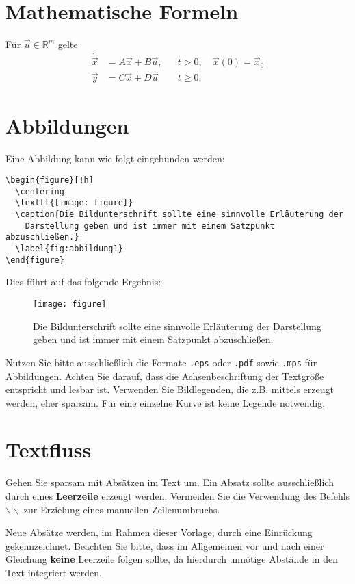 \section{Mathematische Formeln}
%
Für $\vec{u}\in\mathds{R}^m$ gelte 
%
\begin{align}
  \label{eq:gleichung1}
  \dot{\vec{x}} &= A \vec{x} + B \vec{u}, && t>0,\quad\vec{x}(0)=\vec{x}_0\\
  \vec{y} &= C\vec{x} + D\vec{u}&& t\geq 0.
\end{align}
%
%
\section{Abbildungen}
%
Eine Abbildung kann wie folgt eingebunden werden: 
%
\begin{verbatim}
\begin{figure}[!h]
  \centering
  \texttt{[image: figure]}
  \caption{Die Bildunterschrift sollte eine sinnvolle Erläuterung der
    Darstellung geben und ist immer mit einem Satzpunkt abzuschließen.}
  \label{fig:abbildung1}
\end{figure}
\end{verbatim}
%
Dies führt auf das folgende Ergebnis:  
%
\begin{figure}[!h] %
  \centering
  \texttt{[image: figure]}
  \caption{Die Bildunterschrift sollte eine sinnvolle Erläuterung der
    Darstellung geben und ist immer mit einem Satzpunkt abzuschließen.}
  \label{fig:abbildung1}
\end{figure}
%

Nutzen Sie bitte ausschließlich die Formate \texttt{.eps} oder
\texttt{.pdf} sowie \texttt{.mps} für Abbildungen. Achten Sie darauf,
dass die Achsenbeschriftung der Textgröße entspricht und lesbar
ist. Verwenden Sie Bildlegenden, die z.B. mittels \matlab erzeugt
werden, eher sparsam. Für eine einzelne Kurve ist keine Legende
notwendig. 
 
%
\section{Textfluss}
%
Gehen Sie sparsam mit Absätzen im Text um. Ein Absatz sollte
ausschließlich durch eines \textbf{Leerzeile} erzeugt
werden. Vermeiden Sie die Verwendung des Befehls
$\backslash\backslash$ zur Erzielung eines manuellen Zeilenumbruchs. 

Neue Absätze werden, im Rahmen dieser Vorlage, durch eine
Einrückung gekennzeichnet. Beachten Sie bitte, dass im Allgemeinen
vor und nach einer Gleichung \textbf{keine} Leerzeile folgen sollte,
da hierdurch unnötige Abstände in den Text integriert werden. 


